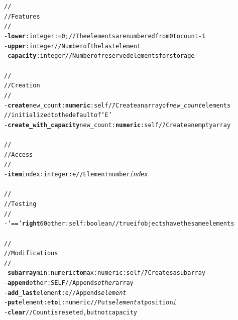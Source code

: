 \documentclass[11pt]{mybook}
\begin{document}
\begin{alltt}
\begin{tabbing}
  //\\
  // Features\\
  //\\
  - {\bf{}lower}:{\sc{}integer} := 0;   \= // The elements are numbered from 0 to count - 1 \\
  - {\bf{}upper}:{\sc{}integer}         \> // Number of the last element \\
  - {\bf{}capacity}:{\sc{}integer}      \> // Number of reserved elements for storage \\
\\
  //\\
  // Creation \\
  //\\
  - {\bf{}create} new_count:{\bf{}numeric} :{\sc{}self}  \= // Create an array of {\it{}new\_count} elements \\
                                                         \> // initialized to the default of 'E'\\
  - {\bf{}create\_with\_capacity} new_count:{\bf{}numeric} :{\sc{}self} \= // Create an empty array \\
\\
  //\\
  // Access\\
  // \\
  - {\bf{}item} index:{\sc{}integer} :{\sc{}e}            // Element number {\it{}index}\\
\\
  //\\
  // Testing\\
  //\\
  - '==' {\bf{}right} 60 other:{\sc{}self} :{\sc{}boolean}   // {\sc{}true} if objects have the same elements \\
\\
  //\\
  // Modifications\\
  //\\
  - {\bf{}subarray} min:{\sc{}numeric} {\bf{}to} max:{\sc{}numeric} :{\sc{}self} \= // Creates a subarray \\
  - {\bf{}append} other:{\sc{}SELF}                                              \> // Appends {\it{}other} array\\
  - {\bf{}add\_last} element:{\sc{}e}                                            \> // Appends {\it{}element} \\
  - {\bf{}put} element:{\sc{}e} {\bf{}to} i:{\sc{}numeric}                       \> // Puts {\it{}element} at position {\it{}i} \\
  - {\bf{}clear}                                // Count is reseted, but not capacity
\end{tabbing}
\end{alltt}
\end{document}
